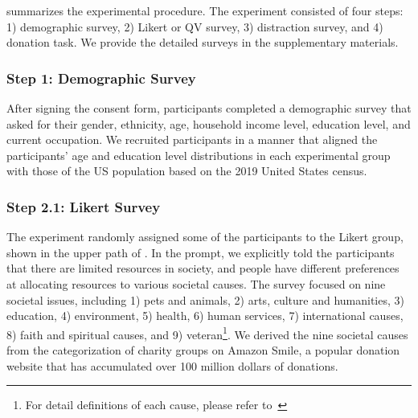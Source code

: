  summarizes the experimental procedure. The experiment consisted of four steps: 1) demographic survey, 2) Likert or QV survey, 3) distraction survey, and 4) donation task. We provide the detailed surveys in the supplementary materials.


\subsubsection{Step 1: Demographic Survey}
After signing the consent form, participants completed a demographic survey that asked for their gender, ethnicity, age, household income level, education level, and current occupation. We recruited participants in a manner that aligned the participants' age and education level distributions in each experimental group with those of the US population based on the 2019 United States census. 

\subsubsection{Step 2.1: Likert Survey}
The experiment randomly assigned some of the participants to the Likert group, shown in the upper path of . In the prompt, we explicitly told the participants that there are limited resources in society, and people have different preferences at allocating resources to various societal causes. The survey focused on nine societal issues, including 1) pets and animals, 2) arts, culture and humanities, 3) education, 4) environment, 5) health, 6) human services, 7) international causes, 8) faith and spiritual causes, and 9) veteran\footnote{For detail definitions of each cause, please refer to~}. We derived the nine societal causes from the categorization of charity groups on Amazon Smile, a popular donation website that has accumulated over 100 million dollars of donations.

